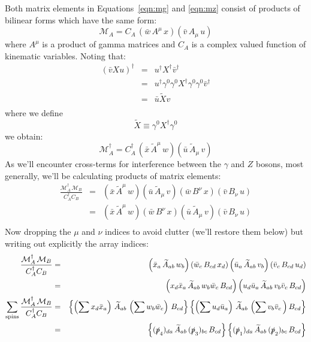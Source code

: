 \documentclass[12pt]{article}
\begin{document}
Both matrix elements in Equations~\ref{eqn:mg} and \ref{eqn:mz} consist of products of bilinear forms which have the same form:
\begin{equation*}
\mathcal{M}_A = C_A \, (\bar{w} \, A^\mu \, x) (\bar{v} \, A_\mu \, u) 
\end{equation*}
where $A^\mu$ is a product of gamma matrices and $C_A$ is a complex valued function of kinematic variables.  Noting that:
\begin{eqnarray*}
(\bar{v} X u)^\dagger &=& u^\dagger X^\dagger \bar{v}^\dagger\\
&=& u^\dagger \gamma^0 \gamma^0 X^\dagger \gamma^0 \gamma^0 \bar{v}^\dagger\\
&=& \bar{u} \widetilde{X} v \\
\end{eqnarray*}
where we define 
\begin{equation}
\widetilde{X} \equiv \gamma^0 X^\dagger \gamma^0 \label{eqn:tilde}
\end{equation}
we obtain:
\begin{equation*}
\mathcal{M}_A^\dagger = C_A^\dagger \, (\bar{x} \, \widetilde{A}^\mu \, w) (\bar{u} \, \widetilde{A}_\mu \, v) 
\end{equation*}
As we'll encounter cross-terms for interference between the $\gamma$ and $Z$ bosons, most generally, we'll be calculating products of matrix elements:
\begin{eqnarray*}
\frac{\mathcal{M}_A^{\dagger} \, \mathcal{M}_B}{C_A^\dagger C_B} &=& 
(\bar{x} \, \widetilde{A}^\mu \, w) (\bar{u} \, \widetilde{A}_\mu \, v) (\bar{w} \, B^\nu \, x) (\bar{v} \, B_\nu \, u) \\
&=& (\bar{x} \, \widetilde{A}^\mu \, w) (\bar{w} \, B^\nu \, x) (\bar{u} \, \widetilde{A}_\mu \, v) (\bar{v} \, B_\nu \, u) \\
\end{eqnarray*}
Now dropping the $\mu$ and $\nu$ indices to avoid clutter (we'll restore them below) but writing out explicitly the array indices:
\begin{eqnarray*}
\frac{\mathcal{M}_A^{\dagger} \, \mathcal{M}_B}{C_A^\dagger C_B} &=& \left( \bar{x}_a \, \widetilde{A}_{ab} \, w_b \right) \left( \bar{w}_c \, B_{cd} \, x_d \right) \left(\bar{u}_a \, \widetilde{A}_{ab} \, v_b \right) \left( \bar{v}_c \, B_{cd} \, u_d \right)\\
&=& \left( x_d \bar{x}_a \, \widetilde{A}_{ab} \, w_b \bar{w}_c \, B_{cd} \right) \left(u_d \bar{u}_a \, \widetilde{A}_{ab} \, v_b \bar{v}_c \, B_{cd} \right) \\
\sum_{\rm spins} \frac{\mathcal{M}_A^{\dagger} \, \mathcal{M}_B}{C_A^\dagger C_B} &=&
\left\{ \left(\sum x_d \bar{x}_a \right) \, \widetilde{A}_{ab} \, \left(\sum w_b \bar{w}_c \right)\, B_{cd} \right\} \left\{ \left(\sum u_d \bar{u}_a \right) \, \widetilde{A}_{ab} \, \left(\sum v_b \bar{v}_c \, \right) B_{cd} \right\} \\
&=& 
\left\{ (\slashed{p}_4)_{da} \, \widetilde{A}_{ab} \, (\slashed{p}_3)_{bc}\, B_{cd} \right\} \left\{ (\slashed{p}_1)_{da} \, \widetilde{A}_{ab} \, (\slashed{p}_2)_{bc} \, B_{cd} \right\} \\
\end{eqnarray*}
\end{document}
